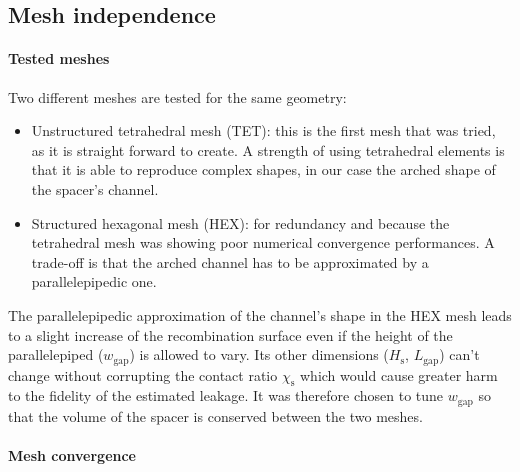 \documentclass[a4paper,11pt,oneside]{report}
\begin{document}
\subsection{Mesh independence}

\paragraph{Tested meshes}
Two different meshes are tested for the same geometry:
\begin{itemize}
    \item Unstructured tetrahedral mesh (TET): this is the first mesh that was tried, as it is straight forward to create. A strength of using tetrahedral elements is that it is able to reproduce complex shapes, in our case the arched shape of the spacer's channel.
    \item Structured hexagonal mesh (HEX): for redundancy and because the tetrahedral mesh was showing poor numerical convergence performances. A trade-off is that the arched channel has to be approximated by a parallelepipedic one.
\end{itemize}

The parallelepipedic approximation of the channel's shape in the HEX mesh leads to a slight increase of the recombination surface even if the height of the parallelepiped ($w_\mathrm{gap}$) is allowed to vary. Its other dimensions ($H_\mathrm{s}$, $L_\mathrm{gap}$) can't change without corrupting the contact ratio $\chi_\mathrm{s}$ which would cause greater harm to the fidelity of the estimated leakage. It was therefore chosen to tune $w_\mathrm{gap}$ so that the volume of the spacer is conserved between the two meshes.


\paragraph{Mesh convergence}
\end{document}
